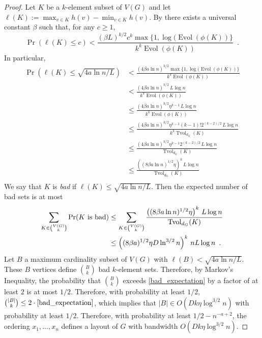 \documentclass{patmorin}
\newcommand{\defin}[1]{\emph{\textcolor{brightmaroon}{#1}}}
\DeclareMathOperator{\evol}{Evol}
\DeclareMathOperator{\tvol}{Tvol}
\begin{document}
\begin{proof}
  Let $K$ be a $k$-element subset of $V(G)$ and let $\ell(K):=\max_{v\in K}h(v)-\min_{v\in K} h(v)$.  By \cite[Theorem~9]{feige:approximating} there exists a universal constant $\beta$ such that, for any $c\ge 1$,
  \[
      \Pr(\ell(K) \le c)
        < \frac{(\beta L)^{k/2}c^k\max\{1,\log(\evol(\phi(K))\}}{k^k\evol(\phi(K))} \enspace .
  \]
  In particular,
  \begin{align*}
    \Pr(\ell(K) \le \sqrt{4a\ln n/L})
      & < \frac{(4\beta a\ln n)^{k/2}\max\{1,\log(\evol(\phi(K))\}}{k^k\evol(\phi(K))} \\
      & < \frac{(4\beta a\ln n)^{k/2}\, L\log n}{k^k\evol(\phi(K))} \\
      & \le \frac{(4\beta a\ln n)^{k/2}\eta^{k-1}\, L\log n}{k^k\evol(\phi(K))} \\
      & \le \frac{(4\beta a\ln n)^{k/2}\eta^{k-1}(k-1)!2^{(k-2)/2}\, L\log n}{k^k\tvol_{d_G}(K)} \\
      & \le \frac{(4\beta a\ln n)^{k/2}\eta^{k-1}2^{(k-2)/2}\,L\log n}{\tvol_{d_G}(K)} \\
      & \le \frac{\left((8\beta a\ln n)^{1/2}\eta\right)^{k}\,L\log n}{\tvol_{d_G}(K)} \\
  \end{align*}
  We say that $K$ is \defin{bad} if $\ell(K) \le \sqrt{4a\ln n/L}$. Then the expected number of bad sets is at most
  \begin{align}
    \sum_{K\in \binom{V(G)}{k}} \Pr(\text{$K$ is bad})
    & \le \sum_{K\in \binom{V(G)}{k}} \frac{\left((8\beta a\ln n)^{1/2}\eta\right)^{k}\, L\log n}{\tvol_{d_G}(K)} \notag \\
    & \le \left((8\beta a)^{1/2}\eta D\ln^{3/2} n\right)^{k}\, nL\log n \enspace .
    \label{bad_expectation}
  \end{align}
  Let $B$ a maximum cardinality subset of $V(G)$ with $\ell(B)<\sqrt{4a\ln n/L}$.  These $B$ vertices define $\binom{B}{k}$ bad $k$-element sets. Therefore, by Markov's Inequality, the probability that $\binom{B}{k}$ exceeds \eqref{bad_expectation} by a factor of at least $2$ is at most $1/2$.  Therefore, with probability at least $1/2$, $\binom{|B|}{k}\le 2\cdot\eqref{bad_expectation}$, which implies that $|B|\in O(Dk\eta\log^{3/2} n)$ with probability at least $1/2$.  Therefore, with probability at least $1/2-n^{-a+2}$, the ordering $x_1,\ldots,x_n$ defines a layout of $G$ with bandwidth $O(Dk\eta\log^{3/2} n)$.
\end{proof}
\end{document}

